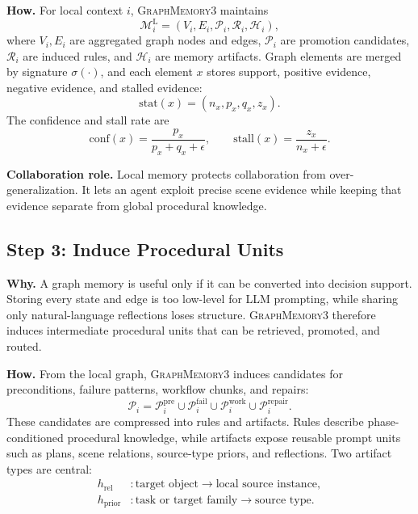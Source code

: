\documentclass[11pt]{article}
\newcommand{\modelname}{\textsc{GraphMemory3}\xspace}
\newcommand{\localmem}{\mathcal{M}^{\mathrm{L}}}
\newcommand{\sig}{\sigma}
\begin{document}
\textbf{How.} For local context $i$, \modelname maintains
\begin{equation}
    \localmem_i =
    \left(V_i, E_i, \mathcal{P}_i, \mathcal{R}_i, \mathcal{H}_i\right),
\end{equation}
where $V_i,E_i$ are aggregated graph nodes and edges, $\mathcal{P}_i$ are
promotion candidates, $\mathcal{R}_i$ are induced rules, and $\mathcal{H}_i$ are
memory artifacts. Graph elements are merged by signature $\sig(\cdot)$, and each
element $x$ stores support, positive evidence, negative evidence, and stalled
evidence:
\begin{equation}
    \mathrm{stat}(x) = (n_x,p_x,q_x,z_x).
\end{equation}
The confidence and stall rate are
\begin{equation}
    \mathrm{conf}(x)=\frac{p_x}{p_x+q_x+\epsilon},
    \qquad
    \mathrm{stall}(x)=\frac{z_x}{n_x+\epsilon}.
\end{equation}

\textbf{Collaboration role.} Local memory protects collaboration from
over-generalization. It lets an agent exploit precise scene evidence while keeping
that evidence separate from global procedural knowledge.

\subsection{Step 3: Induce Procedural Units}

\textbf{Why.} A graph memory is useful only if it can be converted into decision
support. Storing every state and edge is too low-level for LLM prompting, while
sharing only natural-language reflections loses structure. \modelname therefore
induces intermediate procedural units that can be retrieved, promoted, and routed.

\textbf{How.} From the local graph, \modelname induces candidates for
preconditions, failure patterns, workflow chunks, and repairs:
\begin{equation}
    \mathcal{P}_i =
    \mathcal{P}^{\mathrm{pre}}_i
    \cup \mathcal{P}^{\mathrm{fail}}_i
    \cup \mathcal{P}^{\mathrm{work}}_i
    \cup \mathcal{P}^{\mathrm{repair}}_i .
\end{equation}
These candidates are compressed into rules and artifacts. Rules describe
phase-conditioned procedural knowledge, while artifacts expose reusable prompt
units such as plans, scene relations, source-type priors, and reflections. Two
artifact types are central:
\begin{align}
    h_{\mathrm{rel}} &: \text{target object} \rightarrow \text{local source instance},
    \\
    h_{\mathrm{prior}} &: \text{task or target family} \rightarrow \text{source type}.
\end{align}
\end{document}
